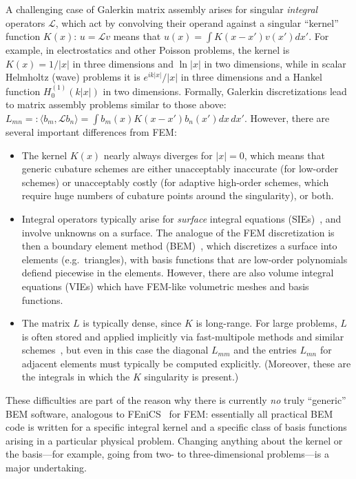 \fi

A challenging case of Galerkin matrix assembly arises for singular
\emph{integral} operators $\mathcal{L}$, which act by
convolving their operand against a singular ``kernel'' function
$K(x)$: $u = \mathcal{L} v$ means that $u(x) = \int K(x - x') v(x')
dx'$.
For example, in electrostatics and other Poisson problems, the
kernel is $K(x) = 1/|x|$ in three dimensions and $\ln |x|$ in two
dimensions, while in scalar Helmholtz (wave) problems it is
$e^{ik|x|}/|x|$ in three dimensions and a Hankel function
$H^{(1)}_0(k|x|)$ in two dimensions.
Formally, Galerkin discretizations lead to matrix assembly problems
similar to those above:
$L_{mn} =: \langle b_m, \mathcal{L} b_n \rangle = \int b_m(x) K(x - x') b_n(x') dx\,dx'$.
However, there are several important differences from FEM:

\begin{itemize}
\item The kernel $K(x)$ nearly always diverges for $|x|=0$, which means that generic
cubature schemes are either unacceptably inaccurate (for low-order schemes) or
unacceptably costly (for adaptive high-order schemes, which require huge numbers
of cubature points around the singularity), or both.

\item Integral operators typically arise for \emph{surface} integral
equations (SIEs)~\cite{Bonnet99,Chew09}, and involve unknowns on a surface.
The analogue of the FEM discretization is then a boundary element method
(BEM)~\cite{Bonnet99,Chew09}, which discretizes a surface into elements
(e.g.\ triangles), with basis functions that are low-order
polynomials defiend piecewise in the elements.
However, there are also volume integral equations (VIEs) which have FEM-like
volumetric meshes and basis functions.

\item The matrix $L$ is typically dense, since $K$ is long-range.
For large problems, $L$ is often stored and applied implicitly via
fast-multipole methods and similar schemes~\cite{Chew01,Liu14}, but even in this
case the diagonal $L_{mm}$ and the entries $L_{mn}$ for adjacent
elements must typically be computed explicitly.
(Moreover, these are the integrals in which the $K$ singularity is present.)
\end{itemize}

These difficulties are part of the reason why there is currently \emph{no}
truly ``generic'' BEM software, analogous to FEniCS~\cite{FEniCS12} for FEM: essentially
all practical BEM code is written for a specific integral kernel and
a specific class of basis functions arising in a particular physical problem.
Changing anything about the kernel or the basis---for example, going
from two- to three-dimensional problems---is a major undertaking.

